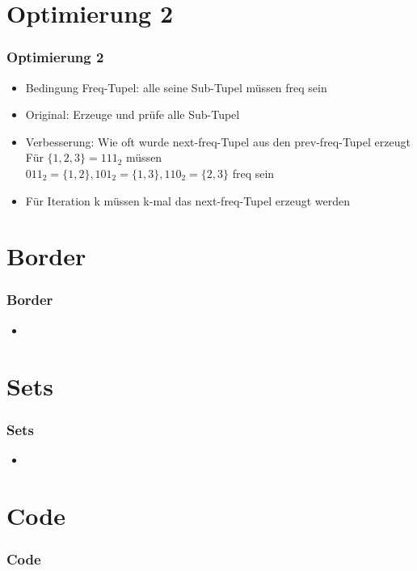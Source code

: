 \documentclass{beamer}
\begin{document}
\section{Optimierung 2}
\begin{frame} %
	\frametitle{Optimierung 2} %
		\begin{itemize}
			\item Bedingung Freq-Tupel: alle seine Sub-Tupel müssen freq sein
			\item Original: Erzeuge und prüfe alle Sub-Tupel 
			\item Verbesserung: Wie oft wurde next-freq-Tupel aus den prev-freq-Tupel erzeugt\\
				\hspace{0.7cm}Für $\{1,2,3\} = 111_2$ müssen \\
				\hspace{0.7cm}${011_2=\{1,2\}, 101_2=\{1,3\}, 110_2=\{2,3\}}$ freq sein
				\hspace{0.7cm} 
			\item Für Iteration k müssen k-mal das next-freq-Tupel erzeugt werden
		\end{itemize}
\end{frame}


\section{Border}
\begin{frame} %
	\frametitle{Border} %
		\begin{itemize}
			\item 
		\end{itemize}
\end{frame}

\section{Sets}
\begin{frame} %
	\frametitle{Sets} %
		\begin{itemize}
			\item 
		\end{itemize}
\end{frame}

\section{Code}
\begin{frame} %
	\frametitle{Code} %
	
\end{frame}
\end{document}
